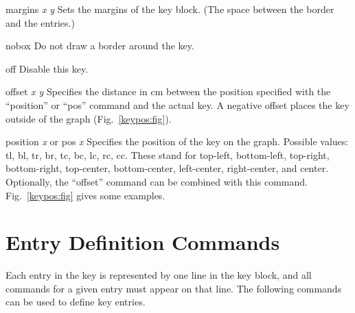\begin{commanddescription}
\item[{\sf margins} {\it x} {\it y}]
Sets the margins of the key block. (The space between the border and the entries.)

\item[{\sf nobox}]
Do not draw a border around the key.

\item[{\sf off}]
Disable this key.

\item[{\sf offset} {\it x y}]
Specifies the distance in cm between the position specified with the ``position'' or ``pos'' command and the actual key. A negative offset places the key outside of the graph (Fig.~\ref{keypos:fig}).

\item[{\sf position} {\it x} or {\sf pos} {\it x}]
Specifies the position of the key on the graph. Possible values: tl, bl, tr, br, tc, bc, lc, rc, cc. These stand for top-left, bottom-left, top-right, bottom-right, top-center, bottom-center, left-center, right-center, and center. Optionally, the ``offset'' command can be combined with this command. Fig.~\ref{keypos:fig} gives some examples.

\end{commanddescription}

\section{Entry Definition Commands}

Each entry in the key is represented by one line in the key block, and all commands for a given entry must appear on that line. The following commands can be used to define key entries.

